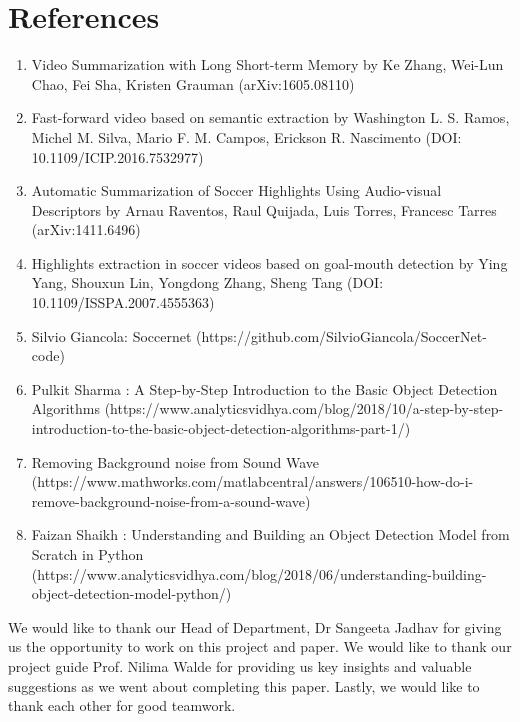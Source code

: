\documentclass[twocolumn,showpacs,%
  nofootinbib,aps,superscriptaddress,%
  eqsecnum,prd,notitlepage,showkeys,10pt]{revtex4-1}
\begin{document}
\section{References}
\begin{enumerate}
    \item Video Summarization with Long Short-term Memory by Ke Zhang, Wei-Lun Chao, Fei Sha, Kristen Grauman (arXiv:1605.08110)
    \item Fast-forward video based on semantic extraction by Washington L. S. Ramos, Michel M. Silva, Mario F. M. Campos, Erickson R. Nascimento (DOI: 10.1109/ICIP.2016.7532977)
    \item Automatic Summarization of Soccer Highlights Using Audio-visual Descriptors by Arnau Raventos, Raul Quijada, Luis Torres, Francesc Tarres (arXiv:1411.6496)
    \item Highlights extraction in soccer videos based on goal-mouth detection by Ying Yang, Shouxun Lin, Yongdong Zhang, Sheng Tang (DOI: 10.1109/ISSPA.2007.4555363)
    \item Silvio Giancola: Soccernet 
    (https://github.com/SilvioGiancola/SoccerNet-code)
    \item Pulkit Sharma : A Step-by-Step Introduction to the Basic Object Detection Algorithms
    (https://www.analyticsvidhya.com/blog/2018/10/a-step-by-step-introduction-to-the-basic-object-detection-algorithms-part-1/)
    \item Removing Background noise from Sound Wave
    (https://www.mathworks.com/matlabcentral/answers/106510-how-do-i-remove-background-noise-from-a-sound-wave)
    \item Faizan Shaikh : Understanding and Building an Object Detection Model from Scratch in Python
    (https://www.analyticsvidhya.com/blog/2018/06/understanding-building-object-detection-model-python/)
\end{enumerate}


\begin{acknowledgments}

We would like to thank our Head of Department, Dr Sangeeta Jadhav for giving us the opportunity to work on this project and paper. We would like to thank our project guide Prof. Nilima Walde for providing us key insights and valuable suggestions as we went about completing this paper. Lastly, we would like to thank each other for good teamwork.

\end{acknowledgments}
\end{document}
